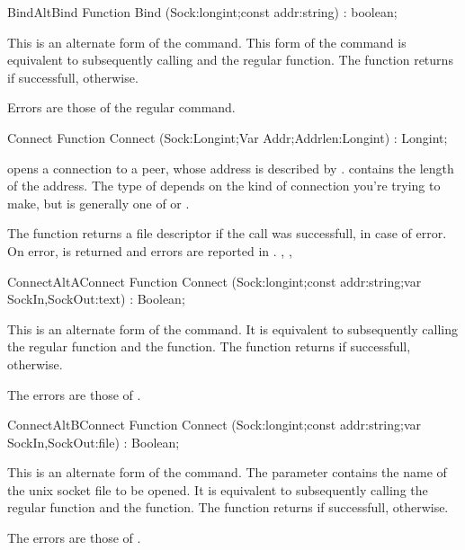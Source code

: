 \begin{functionl}{Bind}{AltBind}
\Declaration
Function Bind (Sock:longint;const addr:string) : boolean;

\Description
This is an alternate form of the  command.
This form of the  command is equivalent to subsequently 
calling  and the regular  function.
The function returns  if successfull,  otherwise.

\Errors
Errors are those of the regular  command.
\SeeAlso
{}
\end{functionl}
\begin{function}{Connect}
\Declaration
Function Connect (Sock:Longint;Var Addr;Addrlen:Longint) : Longint;

\Description
{} opens a connection to a peer, whose address is described by
.  contains the length of the address.
The type of  depends on the kind of connection you're trying to
make, but is generally one of  or .

The  function returns a file descriptor if the call
was successfull,  in case of error.
\Errors
On error,  is returned and errors are reported in 
.
\SeeAlso
{}, ,
\end{function}
\latex{}
\html{}
\begin{functionl}{Connect}{AltAConnect}
\Declaration
Function Connect (Sock:longint;const addr:string;var SockIn,SockOut:text) : Boolean;

\Description
 This is an alternate form of the  command. 
It is equivalent to subsequently calling the regular  
function and the   function.
The function returns  if successfull,  otherwise.

\Errors
The errors are those of .
\SeeAlso
{}
\end{functionl}
\begin{functionl}{Connect}{AltBConnect}
\Declaration
Function Connect (Sock:longint;const addr:string;var SockIn,SockOut:file) : Boolean;

\Description
 This is an alternate form of the  command. The parameter
 contains the name of the unix socket file to be opened. 
It is equivalent to subsequently calling the regular  
function and the   function.
The function returns  if successfull,  otherwise.

\Errors
The errors are those of .
\SeeAlso
{}
\end{functionl}
